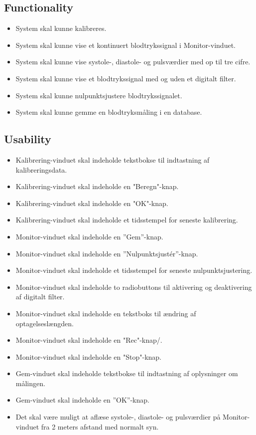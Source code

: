 \subsection{Functionality}
\begin{itemize}
	\item System skal kunne kalibreres. 
	\item System skal kunne vise et kontinuert blodtrykssignal i Monitor-vinduet.
	\item System skal kunne vise systole-, diastole- og pulsværdier med op til tre cifre.
	\item System skal kunne vise et blodtrykssignal med og uden et digitalt filter.
	\item System skal kunne nulpunktsjustere blodtrykssignalet.
	\item System skal kunne gemme en blodtryksmåling i en database.
\end{itemize}

\subsection{Usability}
\begin{itemize}
	\item Kalibrering-vinduet skal indeholde tekstbokse til indtastning af kalibreringsdata. 
	\item Kalibrering-vinduet skal indeholde en "Beregn"\--knap. 
	\item Kalibrering-vinduet skal indeholde en "OK"\--knap.
	\item Kalibrering-vinduet skal indeholde et tidsstempel for seneste kalibrering.
	\item Monitor-vinduet skal indeholde en ”Gem”\--knap.
	\item Monitor-vinduet skal indeholde en ”Nulpunktsjustér”\--knap.
	\item Monitor-vinduet skal indeholde et tidsstempel for seneste nulpunktsjustering.
	\item Monitor-vinduet skal indeholde to radiobuttons til aktivering og deaktivering af digitalt filter.
	\item Monitor-vinduet skal indeholde en tekstboks til ændring af optagelseslængden.  
	\item Monitor-vinduet skal indeholde en "Rec"\--knap/.
	\item Monitor-vinduet skal indeholde en "Stop"\--knap.
	\item Gem-vinduet skal indeholde tekstbokse til indtastning af oplysninger om målingen. 
	\item Gem-vinduet skal indeholde en ”OK”\--knap.
	\item Det skal være muligt at aflæse systole-, diastole- og pulsværdier på Monitor-vinduet fra 2 meters afstand med normalt syn.
\end{itemize}

